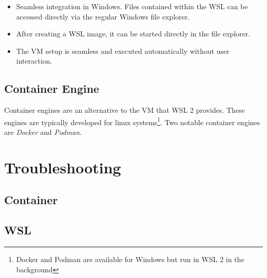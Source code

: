 \begin{itemize}
  \item Seamless integration in Windows.
    Files contained within the WSL can be accessed directly via the regular Windows file explorer.
  \item After creating a WSL image, it can be started directly in the file explorer.
  \item The VM setup is seamless and executed automatically without user
    interaction.
\end{itemize}

\subsection{Container Engine}
Container engines are an alternative to the VM that WSL 2 provides.
These engines are typically developed for linux systems\footnote{Docker and Podman are available for Windows but run in WSL 2 in the background}.
Two notable container engines are \emph{Docker} and \emph{Podman}.

\newpage



\newpage



\newpage



\newpage



\newpage

\appendix



\newpage

\section{Troubleshooting}



\subsection{Container}



\subsection{WSL}



